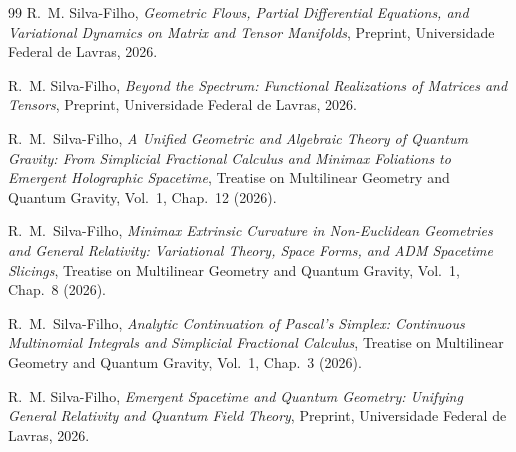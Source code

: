 \documentclass[aps,prl,reprint,twocolumn,superscriptaddress,nofootinbib,floatfix]{revtex4-2}
\begin{document}
\begin{thebibliography}{99}
R.~M. Silva-Filho,
\emph{Geometric Flows, Partial Differential Equations, and Variational Dynamics on Matrix and Tensor Manifolds},
Preprint, Universidade Federal de Lavras, 2026.

R.~M. Silva-Filho,
\emph{Beyond the Spectrum: Functional Realizations of Matrices and Tensors},
Preprint, Universidade Federal de Lavras, 2026.

R.~M.~Silva-Filho,
\emph{A Unified Geometric and Algebraic Theory of Quantum Gravity: From Simplicial Fractional Calculus and Minimax Foliations to Emergent Holographic Spacetime},
Treatise on Multilinear Geometry and Quantum Gravity, Vol.~1, Chap.~12 (2026).

R.~M.~Silva-Filho,
\emph{Minimax Extrinsic Curvature in Non-Euclidean Geometries and General Relativity: Variational Theory, Space Forms, and ADM Spacetime Slicings},
Treatise on Multilinear Geometry and Quantum Gravity, Vol.~1, Chap.~8 (2026).

R.~M.~Silva-Filho,
\emph{Analytic Continuation of Pascal's Simplex: Continuous Multinomial Integrals and Simplicial Fractional Calculus},
Treatise on Multilinear Geometry and Quantum Gravity, Vol.~1, Chap.~3 (2026).

R.~M. Silva-Filho,
\emph{Emergent Spacetime and Quantum Geometry: Unifying General Relativity and Quantum Field Theory},
Preprint, Universidade Federal de Lavras, 2026.

\end{thebibliography}
\end{document}
